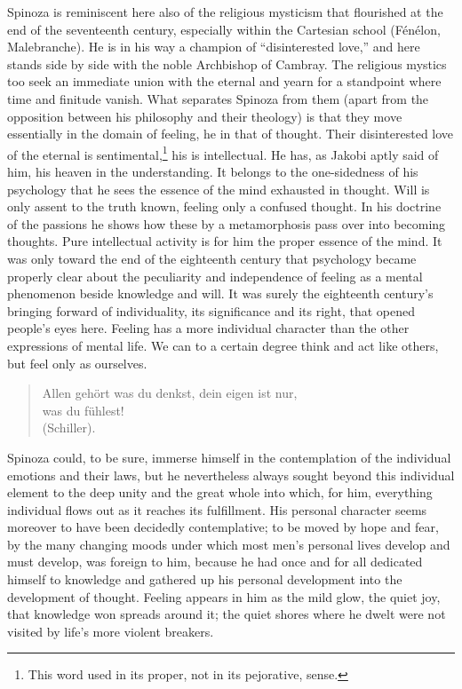 \documentclass[12pt]{book}
\newcommand{\opage}[1]{\marginnote{\footnotesize\textit{[#1]}}}
\begin{document}
Spinoza is reminiscent here also of the religious mysticism that flourished at the end
of the seventeenth century, \opage{145}especially within the Cartesian school (Fénélon,
Malebranche). He is in his way a champion of ``disinterested love,'' and here stands side
by side with the noble Archbishop of Cambray. The religious mystics too seek an immediate
union with the eternal and yearn for a standpoint where time and finitude vanish. What
separates Spinoza from them (apart from the opposition between his philosophy and their
theology) is that they move essentially in the domain of feeling, he in that of thought.
Their disinterested love of the eternal is sentimental,\footnote{This word used in its
proper, not in its pejorative, sense.} his is intellectual. He has, as Jakobi aptly said
of him, his heaven in the understanding. It belongs to the one-sidedness of his
psychology that he sees the essence of the mind exhausted in thought. Will is only assent
to the truth known, feeling only a confused thought. In his doctrine of the passions he
shows how these by a metamorphosis pass over into becoming thoughts. Pure intellectual
activity is for him the proper essence of the mind. It was only toward the end of the
eighteenth century that psychology became properly clear about the peculiarity and
independence of feeling as a mental phenomenon beside knowledge and will. It was surely
the eighteenth century's bringing forward of individuality, its significance and its
right, that opened people's eyes here. Feeling has a more individual character than the
other expressions of mental life. We can to a certain degree think and act like others,
but feel only as ourselves.
\begin{quote}
\opage{146}Allen gehört was du denkst, dein eigen ist nur,\\
\hspace*{4em}was du fühlest!\\
\hspace*{2em}(Schiller).
\end{quote}
Spinoza could, to be sure, immerse himself in the contemplation of the individual
emotions and their laws, but he nevertheless always sought beyond this individual
element to the deep unity and the great whole into which, for him, everything individual
flows out as it reaches its fulfillment. His personal character seems moreover to have
been decidedly contemplative; to be moved by hope and fear, by the many changing moods
under which most men's personal lives develop and must develop, was foreign to him,
because he had once and for all dedicated himself to knowledge and gathered up his
personal development into the development of thought. Feeling appears in him as the mild
glow, the quiet joy, that knowledge won spreads around it; the quiet shores where he
dwelt were not visited by life's more violent breakers.
\end{document}
